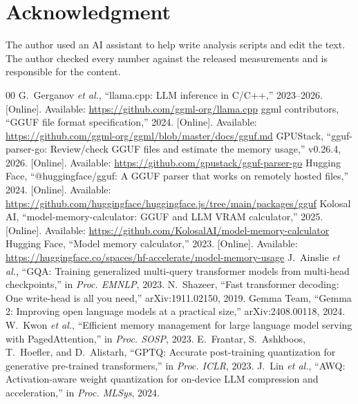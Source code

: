 \documentclass[conference]{IEEEtran}
\begin{document}
\section*{Acknowledgment}
The author used an AI assistant to help write analysis scripts and edit the text. The author checked every number against the released measurements and is responsible for the content.

\begin{thebibliography}{00}
\footnotesize
{} G.~Gerganov \emph{et al.}, ``llama.cpp: LLM inference in C/C++,'' 2023--2026. [Online]. Available: \url{https://github.com/ggml-org/llama.cpp}
 ggml contributors, ``GGUF file format specification,'' 2024. [Online]. Available: \url{https://github.com/ggml-org/ggml/blob/master/docs/gguf.md}
 GPUStack, ``gguf-parser-go: Review/check GGUF files and estimate the memory usage,'' v0.26.4, 2026. [Online]. Available: \url{https://github.com/gpustack/gguf-parser-go}
 Hugging Face, ``@huggingface/gguf: A GGUF parser that works on remotely hosted files,'' 2024. [Online]. Available: \url{https://github.com/huggingface/huggingface.js/tree/main/packages/gguf}
 Kolosal AI, ``model-memory-calculator: GGUF and LLM VRAM calculator,'' 2025. [Online]. Available: \url{https://github.com/KolosalAI/model-memory-calculator}
 Hugging Face, ``Model memory calculator,'' 2023. [Online]. Available: \url{https://huggingface.co/spaces/hf-accelerate/model-memory-usage}
 J.~Ainslie \emph{et al.}, ``GQA: Training generalized multi-query transformer models from multi-head checkpoints,'' in \emph{Proc. EMNLP}, 2023.
 N.~Shazeer, ``Fast transformer decoding: One write-head is all you need,'' arXiv:1911.02150, 2019.
 Gemma Team, ``Gemma 2: Improving open language models at a practical size,'' arXiv:2408.00118, 2024.
 W.~Kwon \emph{et al.}, ``Efficient memory management for large language model serving with PagedAttention,'' in \emph{Proc. SOSP}, 2023.
 E.~Frantar, S.~Ashkboos, T.~Hoefler, and D.~Alistarh, ``GPTQ: Accurate post-training quantization for generative pre-trained transformers,'' in \emph{Proc. ICLR}, 2023.
 J.~Lin \emph{et al.}, ``AWQ: Activation-aware weight quantization for on-device LLM compression and acceleration,'' in \emph{Proc. MLSys}, 2024.
\end{thebibliography}
\end{document}
